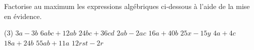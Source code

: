 %
%
    Factorise au maximum les expressions algébriques ci-dessous à l'aide
    de la mise en évidence.
    \begin{tasks}(3)
        \task $3a-3b$
        \task $6abc+12ab$
        \task $24bc+36cd$
        \task $2ab-2ac$
        \task $16a+40b$
        \task $25x-15y$
        \task $4a+4c$
        \task $18a+24b$
        \task $55ab+11a$
        \task $12rst-2r$
    \end{tasks}
